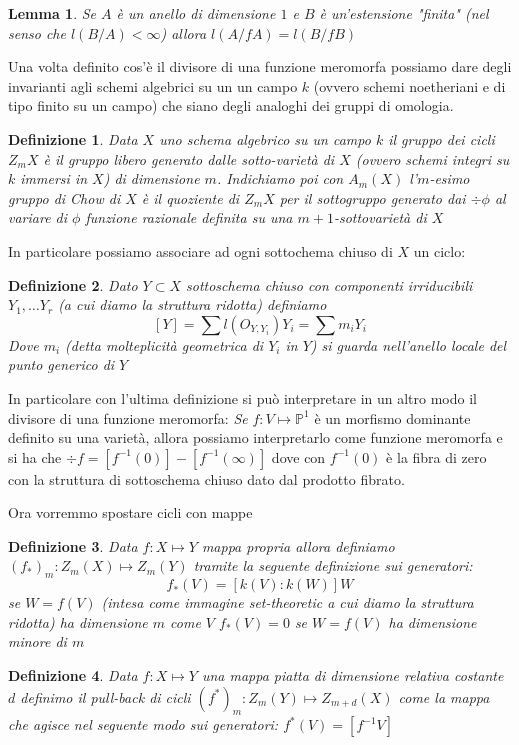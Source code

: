 \documentclass{amsbook}
\newcommand{\PP}{\mathbb{P}}
\newcommand{\inv}{^{-1}}
\newcommand{\mm}{\mapsto}
\newtheorem{lem}{Lemma}
\newtheorem*{def*}{Definizione}
\theoremstyle{remark}
\begin{document}
\begin{lem}
Se $A$ è un anello di dimensione $1$ e $B$ è un'estensione "finita" (nel senso che $l(B/A)<\infty$) allora $l(A/fA)=l(B/fB)$
\end{lem}

Una volta definito cos'è il divisore di una funzione meromorfa possiamo dare degli invarianti agli schemi algebrici su un un campo $k$ (ovvero schemi noetheriani e di tipo finito su un campo) che siano degli analoghi dei gruppi di omologia. 

\begin{def*}
Data $X$ uno schema algebrico su un campo $k$ il gruppo dei cicli $Z_mX$ è il gruppo libero generato dalle sotto-varietà di $X$ (ovvero schemi integri su $k$ immersi in $X$) di dimensione $m$. Indichiamo poi con $A_m(X)$ l'$m$-esimo gruppo di Chow di $X$ è il quoziente di $Z_mX$ per il sottogruppo generato dai $\div \phi$ al variare di $\phi $ funzione razionale definita su una $m+1$-sottovarietà di $X$
\end{def*}

In particolare possiamo associare ad ogni sottochema chiuso di $X$ un ciclo:
\begin{def*}
Dato $Y\subset X$ sottoschema chiuso con componenti irriducibili $Y_1, \dots Y_r$ (a cui diamo la struttura ridotta) definiamo $$ [Y]= \sum l(O_{Y,Y_i}) Y_i=\sum m_i Y_i$$
Dove $m_i$ (detta molteplicità geometrica di $Y_i$ in $Y$) si guarda nell'anello locale del punto generico di $Y$
\end{def*}

In particolare con l'ultima definizione si può interpretare in un altro modo il divisore di una funzione meromorfa:
\emph{Se} $f:V\mm \PP^1$ è un morfismo dominante definito su una varietà, allora possiamo interpretarlo come funzione meromorfa e si ha che $\div f= [f\inv(0)] - [f\inv (\infty)]$ dove con $f\inv(0)$ è la fibra di zero con la struttura di sottoschema chiuso dato dal prodotto fibrato.

Ora vorremmo spostare cicli con mappe
\begin{def*}
Data $f:X\mm Y$ mappa propria allora definiamo $(f_*)_m:Z_m(X)\mm Z_m(Y)$ tramite la seguente definizione sui generatori:
$$ f_*(V)=[k(V):k(W)] W$$ se $W=f(V)$ (intesa come immagine set-theoretic a cui diamo la struttura ridotta) ha dimensione  $m$ come $V$
$f_*(V)=0$ se $W=f(V)$ ha dimensione minore di $m$
\end{def*}

\begin{def*}
Data $f:X\mm Y$ una mappa piatta di dimensione relativa costante $d$ definimo il pull-back di cicli $(f^*)_m:Z_m(Y)\mm Z_{m+d}(X)$ come la mappa che agisce nel seguente modo sui generatori: $f^*(V)=[f\inv V]$
\end{def*}
\end{document}
